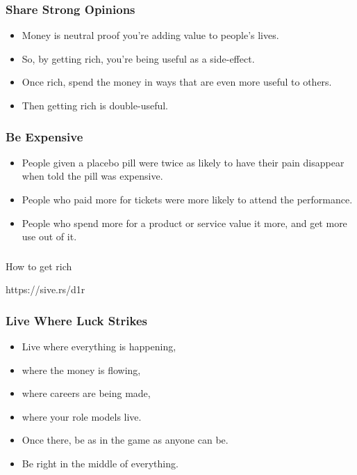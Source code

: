 \begin{frame}[fragile]\frametitle{Share Strong Opinions}

\begin{itemize}
\item Money is neutral proof you’re adding value to people’s lives.
\item So, by getting rich, you’re being useful as a side-effect.
\item Once rich, spend the money in ways that are even more useful to others.
\item Then getting rich is double-useful.
\end{itemize}

\end{frame}

\begin{frame}[fragile]\frametitle{Be Expensive}

\begin{itemize}
\item People given a placebo pill were twice as likely to have their pain disappear when told the pill was expensive.
\item People who paid more for tickets were more likely to attend the performance.
\item People who spend more for a product or service value it more, and get more use out of it.
\end{itemize}

\end{frame}

\begin{frame}[fragile]\frametitle{}
\begin{center}
{\Large How to get rich}
\end{center}

{\tiny https://sive.rs/d1r}

\end{frame}

\begin{frame}[fragile]\frametitle{Live Where Luck Strikes}

\begin{itemize}
\item Live where everything is happening,
\item where the money is flowing,
\item where careers are being made,
\item where your role models live.
\item Once there, be as in the game as anyone can be.
\item Be right in the middle of everything.
\end{itemize}

\end{frame}

